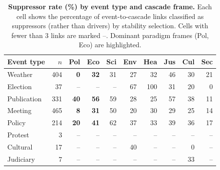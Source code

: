 \begin{table}[h]
\centering
\renewcommand{\arraystretch}{1.15}
\caption{\textbf{Suppressor rate (\%) by event type and cascade frame.}
Each cell shows the percentage of event-to-cascade links classified
as suppressors (rather than drivers) by stability selection.
Cells with fewer than 3 links are marked --.
Dominant paradigm frames (Pol, Eco) are highlighted.}
\label{tab:si_event_frame}
\vspace{0.3em}
\footnotesize
\begin{tabular}{@{}l r r r r r r r r r@{}}
\toprule
Event type & $n$ & \textbf{Pol} & \textbf{Eco} & Sci & Env & Hea & Jus & Cul & Sec \\
\midrule
Weather & 404 & \textbf{0} & \textbf{32} & 31 & 27 & 32 & 46 & 30 & 21 \\
Election & 37 & -- & -- & -- & 67 & 100 & 31 & 20 & 0 \\
Publication & 331 & \textbf{40} & \textbf{56} & 59 & 28 & 25 & 57 & 38 & 11 \\
Meeting & 465 & \textbf{8} & \textbf{31} & 50 & 20 & 30 & 29 & 25 & 14 \\
Policy & 214 & \textbf{20} & \textbf{41} & 62 & 37 & 33 & 39 & 36 & 17 \\
Protest & 3 & -- & -- & -- & -- & -- & -- & -- & -- \\
Cultural & 17 & -- & -- & -- & 40 & -- & -- & 0 & -- \\
Judiciary & 7 & -- & -- & -- & -- & -- & -- & 33 & -- \\
\bottomrule
\end{tabular}
\end{table}